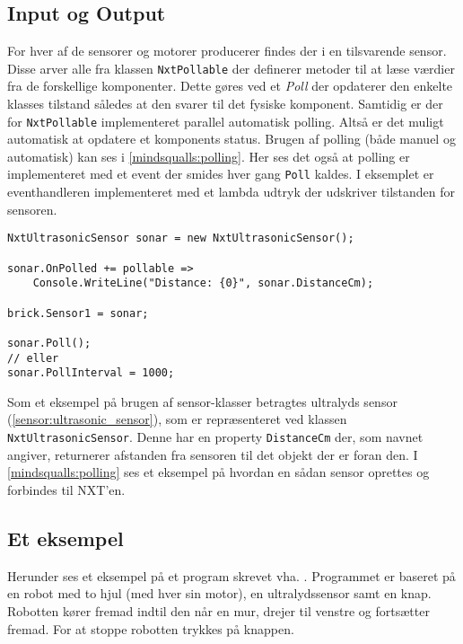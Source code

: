 \subsection{Input og Output}
For hver af de sensorer og motorer \lego producerer findes der i \mindsqualls en tilsvarende sensor.
Disse arver alle fra klassen \lstinline[style=csharp]!NxtPollable! der definerer metoder til at læse værdier fra de forskellige komponenter.
Dette gøres ved et \emph{Poll} der opdaterer den enkelte klasses tilstand således at den svarer til det fysiske komponent.
Samtidig er der for \lstinline[style=csharp]!NxtPollable! implementeret parallel automatisk polling.
Altså er det muligt automatisk at opdatere et komponents status.
Brugen af polling (både manuel og automatisk) kan ses i \cref{mindsqualls:polling}.
Her ses det også at polling er implementeret med et event der smides hver gang \lstinline[style=csharp]!Poll! kaldes.
I eksemplet er eventhandleren implementeret med et lambda udtryk der udskriver tilstanden for sensoren.

\begin{lstlisting}[style=csharpsmall,caption={Et eksempel på polling i \mindsqualls},label=mindsqualls:polling]
NxtUltrasonicSensor sonar = new NxtUltrasonicSensor();

sonar.OnPolled += pollable =>
    Console.WriteLine("Distance: {0}", sonar.DistanceCm);

brick.Sensor1 = sonar;

sonar.Poll();
// eller
sonar.PollInterval = 1000;
\end{lstlisting}

Som et eksempel på brugen af sensor-klasser betragtes \legos ultralyds sensor (\cref{sensor:ultrasonic_sensor}), som er repræsenteret ved klassen \lstinline[style=csharp]!NxtUltrasonicSensor!.
Denne har en property \lstinline[style=csharp]!DistanceCm! der, som navnet angiver, returnerer afstanden fra sensoren til det objekt der er foran den.
I \cref{mindsqualls:polling} ses et eksempel på hvordan en sådan sensor oprettes og forbindes til NXT'en.

\subsection{Et eksempel}
Herunder ses et eksempel på et program skrevet vha. \mindsqualls.
Programmet er baseret på en robot med to hjul (med hver sin motor), en ultralydssensor samt en knap.
Robotten kører fremad indtil den når en mur, drejer til venstre og fortsætter fremad.
For at stoppe robotten trykkes på knappen.

